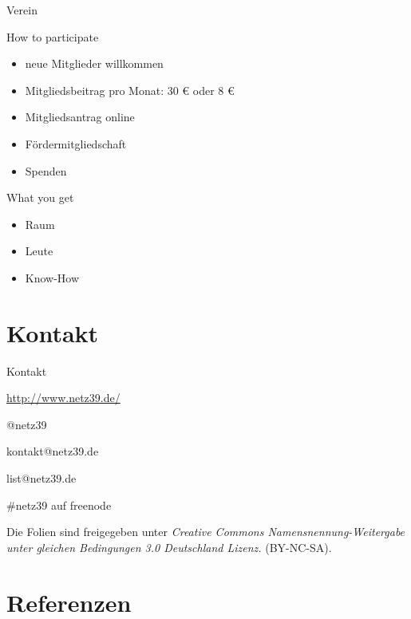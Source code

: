 \documentclass[hyperref={pdfpagelabels=false}]{beamer}
\begin{document}
\begin{frame}{Verein}
    \begin{block}{How to participate}
        \begin{itemize}
            \item neue Mitglieder willkommen
            \item Mitgliedsbeitrag pro Monat: 30 € oder 8 €
            \item Mitgliedsantrag online
            \pause
            \item Fördermitgliedschaft
            \item Spenden
        \end{itemize}
    \end{block}
    \pause
    \begin{block}{What you get}
        \begin{itemize}
            \item Raum
            \item Leute
            \item Know-How
        \end{itemize}
    \end{block}
\end{frame}

\section{Kontakt}

\begin{frame}{Kontakt}
    \begin{description}
        \item[WWW] \url{http://www.netz39.de/}
        \item[Twitter/identi.ca] @netz39
        \item[E-Mail] kontakt@netz39.de
        \item[Mailingliste] list@netz39.de
        \item[IRC] \#netz39 auf freenode
    \end{description}

    \vspace{1em}
    \small
    Die Folien sind freigegeben unter \emph{Creative Commons
    Namensnennung-Weitergabe unter gleichen Bedingungen 3.0 Deutschland
    Lizenz.} (BY-NC-SA).
    \normalsize
\end{frame}

\section*{Referenzen}
\end{document}
